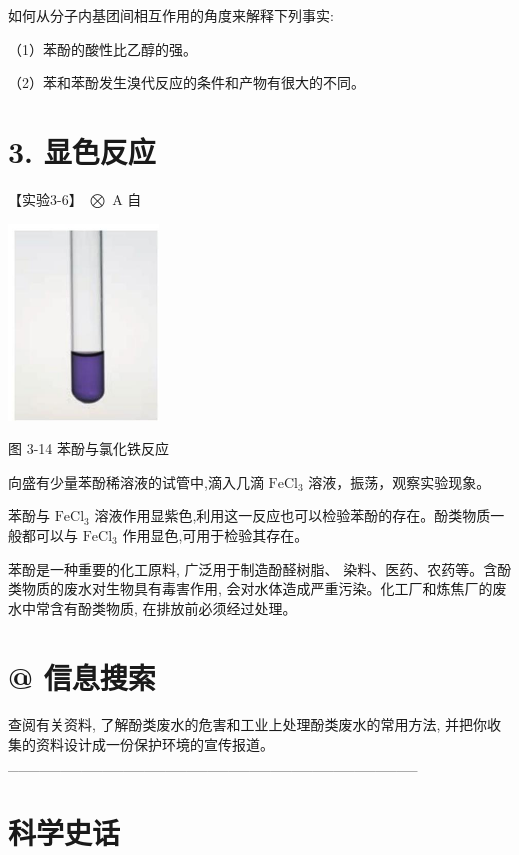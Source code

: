 \documentclass[10pt]{article}
\begin{document}
如何从分子内基团间相互作用的角度来解释下列事实:

（1）苯酚的酸性比乙醇的强。

（2）苯和苯酚发生溴代反应的条件和产物有很大的不同。

\section*{3. 显色反应}

【实验3-6】 \(\bigotimes\) A 自

\begin{center}
\includegraphics[max width=0.3\textwidth]{images/0190efc5-b58a-7c43-bfb0-e0a030df9cfd_71_240014.jpg}
\end{center}

图 3-14 苯酚与氯化铁反应

向盛有少量苯酚稀溶液的试管中,滴入几滴 \({\mathrm{{FeCl}}}_{3}\) 溶液，振荡，观察实验现象。

苯酚与 \({\mathrm{{FeCl}}}_{3}\) 溶液作用显紫色,利用这一反应也可以检验苯酚的存在。酚类物质一般都可以与 \({\mathrm{{FeCl}}}_{3}\) 作用显色,可用于检验其存在。

苯酚是一种重要的化工原料, 广泛用于制造酚醛树脂、 染料、医药、农药等。含酚类物质的废水对生物具有毒害作用, 会对水体造成严重污染。化工厂和炼焦厂的废水中常含有酚类物质, 在排放前必须经过处理。

\section*{@ 信息搜索}

查阅有关资料, 了解酚类废水的危害和工业上处理酚类废水的常用方法, 并把你收集的资料设计成一份保护环境的宣传报道。 \_\_\_\_\_\_\_\_\_\_\_\_\_\_\_\_\_\_\_\_\_\_\_\_\_\_\_\_\_\_\_\_\_\_\_\_\_\_\_

\section*{科学史话}
\end{document}
